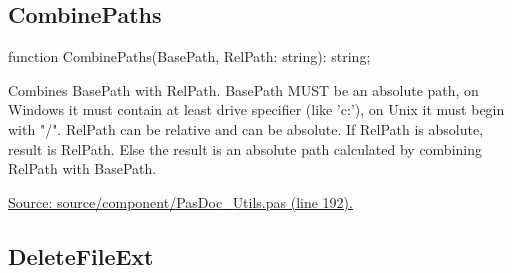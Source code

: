 \documentclass{report}
\newif\ifpdf
\begin{document}
\subsection*{CombinePaths}
\fi
\label{PasDoc_Utils-CombinePaths}
\begin{list}{}{
\setlength{\itemindent}{0cm}
\setlength{\listparindent}{0cm}
\setlength{\leftmargin}{\evensidemargin}
\addtolength{\leftmargin}{\tmplength}
\settowidth{\labelsep}{X}
\addtolength{\leftmargin}{\labelsep}
\setlength{\labelwidth}{\tmplength}
}
\item[\textbf{Declaration}\hfill]
\ifpdf
\begin{flushleft}
\fi
\begin{ttfamily}
function CombinePaths(BasePath, RelPath: string): string;\end{ttfamily}

\ifpdf
\end{flushleft}
\fi

\par
\item[\textbf{Description}]
Combines BasePath with RelPath. BasePath MUST be an absolute path, on Windows it must contain at least drive specifier (like 'c:'), on Unix it must begin with "/". RelPath can be relative and can be absolute. If RelPath is absolute, result is RelPath. Else the result is an absolute path calculated by combining RelPath with BasePath.\par
\href{https://github.com/pasdoc/pasdoc/blob/master/source/component/PasDoc_Utils.pas#L192}{Source: source/component/PasDoc{\_}Utils.pas (line 192).}

\end{list}
\ifpdf
\subsection*{\large{\textbf{DeleteFileExt}}\normalsize\hspace{1ex}\hrulefill}
\else
\end{document}
